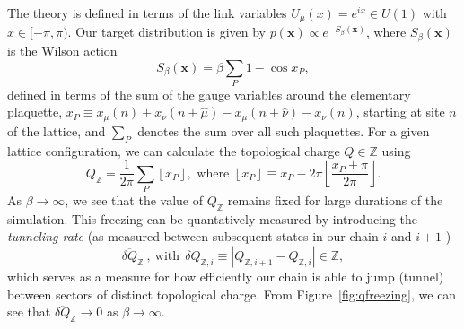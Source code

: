 \documentclass[a4paper,11pt]{article}
\newcommand{\x}{\mathbf{x}}
\begin{document}
%
The theory is defined in terms of the link variables
\(U_{\mu}(x) = e^{i x} \in U(1)\) with \(x \in [-\pi, \pi)\).
%
Our target distribution is given by \(p(\x)\propto e^{-S_{\beta}(\x)}\), where
\(S_{\beta}(\x)\) is the Wilson action
%
\begin{equation}
  S_{\beta}(\x) = \beta \sum_{P} 1 - \cos{x_{P}},
\end{equation}
%
defined in terms of the sum of the gauge variables around the elementary
plaquette, \(x_{P} \equiv x_{\mu}(n) + x_{\nu}(n + \hat{\mu}) -
x_{\mu}(n+\hat{\nu}) - x_{\nu}(n)\), starting at site \(n\) of the
lattice, and \(\sum_{P}\) denotes the sum over all such plaquettes.
%
For a given lattice configuration, we can calculate the topological charge \(Q
\in \mathbb{Z}\) using
%
\begin{equation}
    Q_{\mathbb{Z}} = \frac{1}{2\pi}\sum_{P}\left\lfloor x_{P} \right\rfloor,\text{ where }
    \left\lfloor x_{P} \right\rfloor \equiv x_{P} - 2\pi
    \left\lfloor\frac{x_{P}+\pi}{2\pi}\right\rfloor.
\end{equation}
%
As \(\beta \rightarrow \infty\),
we see that the value of \(Q_\mathbb{Z}\) remains fixed for large
durations of the simulation.
%
This freezing can be quantatively measured by introducing the \emph{tunneling
rate}
(as measured between subsequent states in our chain \(i\) and
\(i+1\) )
%
\begin{equation}
  \overline{\delta Q}_{\mathbb{Z}} ~,~\mathrm{with}~~
  \delta Q_{\mathbb{Z},i} \equiv \left|Q_{\mathbb{Z},i+1} - Q_{\mathbb{Z},i}\right|
    \in \mathbb{Z},
\end{equation}
%
which serves as a measure for how efficiently our chain is able to jump
(tunnel) between sectors of distinct topological charge.
%
From Figure~\ref{fig:qfreezing}, we can see that
\(\overline{\delta Q}_{\mathbb{Z}} \rightarrow 0\) as
\(\beta\rightarrow \infty\).
%
\end{document}
